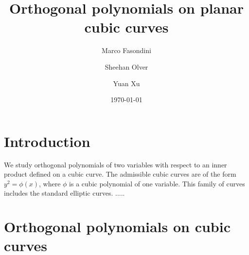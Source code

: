 \documentclass{amsart}
\theoremstyle{remark}
\begin{document}
\title{Orthogonal polynomials on planar cubic curves}

\author{Marco Fasondini}
\address{Department of Mathematics\\
Imperial College\\
 London \\
 United Kingdom  }

\author{Sheehan Olver}
\address{Department of Mathematics\\
Imperial College\\
 London \\
 United Kingdom  }

\author{Yuan Xu}
\address{Department of Mathematics\\ University of Oregon\\
    Eugene, Oregon 97403-1222.}

\date{\today}

\begin{abstract} 
  
\end{abstract}
\maketitle
 
\section{Introduction}
\setcounter{equation}{0}
 
We study orthogonal polynomials of two variables with respect to an inner product defined on a cubic curve. The
admissible cubic curves are of the form $y^2 = \phi(x)$, where $\phi$ is a cubic polynomial of one variable. This
family of curves includes the standard elliptic curves. 
.....
 
\section{Orthogonal polynomials on cubic curves}
\setcounter{equation}{0}
\end{document}
